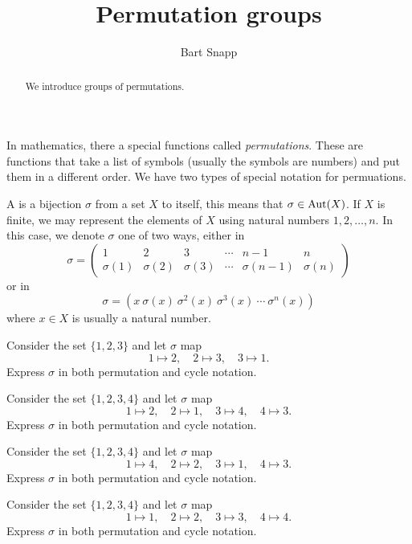 \documentclass{ximera}
\author{Bart Snapp}
\title{Permutation groups}
\begin{document}
\begin{abstract}
  We introduce groups of permutations. 
\end{abstract}
\maketitle

In mathematics, there a special functions called
\textit{permutations}. These are functions that take a list of symbols
(usually the symbols are numbers) and put them in a different order.
We have two types of special notation for permuations.

\begin{definition}
  A  is a bijection $\sigma$ from a set $X$ to
  itself, this means that $\sigma\in\operatorname{Aut}(X)$. If $X$ is finite,
  we may represent the elements of $X$ using natural numbers
  $1,2,\dots,n$. In this case, we denote $\sigma$ one of two ways,
  either in 
  \[
  \sigma = \left(\begin{smallmatrix}
    1 & 2 & 3 & \cdots & n-1 & n \\
    \sigma(1) & \sigma(2) & \sigma(3) & \cdots &  \sigma(n-1)  & \sigma(n)
  \end{smallmatrix}\right)
  \]
  or in 
  \[
  \sigma = (x\ \sigma(x)\ \sigma^2(x)\ \sigma^3(x)\ \cdots\ \sigma^n(x))
  \]
  where $x\in X$ is usually a natural number.
\end{definition}

\begin{exercise}
  Consider the set $\{1,2,3\}$ and let $\sigma$ map
  \[
  1 \mapsto 2, \quad 2 \mapsto 3, \quad 3\mapsto 1.
  \]
  Express $\sigma$ in both permutation and cycle notation.
\end{exercise}


\begin{exercise}
  Consider the set $\{1,2,3,4\}$ and let $\sigma$ map
  \[
  1 \mapsto 2, \quad 2 \mapsto 1, \quad 3\mapsto 4, \quad 4\mapsto 3.
  \]
  Express $\sigma$ in both permutation and cycle notation.
\end{exercise}

\begin{exercise}
  Consider the set $\{1,2,3,4\}$ and let $\sigma$ map
  \[
  1 \mapsto 4, \quad 2 \mapsto 2, \quad 3\mapsto 1, \quad 4\mapsto 3.
  \]
  Express $\sigma$ in both permutation and cycle notation.
\end{exercise}

\begin{exercise}
  Consider the set $\{1,2,3,4\}$ and let $\sigma$ map
  \[
  1 \mapsto 1, \quad 2 \mapsto 2, \quad 3\mapsto 3, \quad 4\mapsto 4.
  \]
  Express $\sigma$ in both permutation and cycle notation.
\end{exercise}
\end{document}
